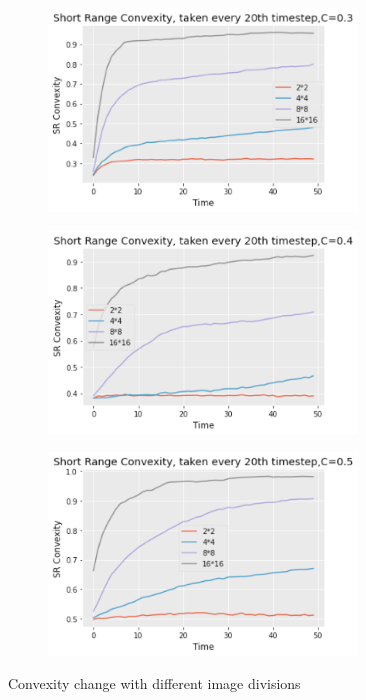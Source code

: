 \documentclass[12pt, a4paper]{report}
\begin{document}
\begin{figure}[H]
\centering
\begin{subfigure}{.45\textwidth}
  \centering
  \includegraphics[width=0.9\textwidth]{Pictures/MSFeatures/shac_0.3_24816.png}
  \label{img:microstrImg}
\end{subfigure}
\begin{subfigure}{.45\textwidth}
  \centering
  \includegraphics[width=0.9\textwidth]{Pictures/MSFeatures/shac_04_24816.png}
  \label{img:microstrImg}
\end{subfigure}
\begin{subfigure}{.45\textwidth}
  \centering
  \includegraphics[width=0.9\textwidth]{Pictures/MSFeatures/shac_05_24816.png}
  \label{img:microstrImg}
\end{subfigure}
\caption{Convexity change with different image divisions}
\label{fig:test}
\end{figure}
\end{document}
